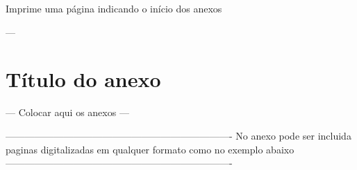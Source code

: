 
\begin{anexosenv}
	
	Imprime uma página indicando o início dos anexos
	\partanexos	
	
	---
	\chapter{Título do anexo}
	---
	Colocar aqui os anexos
	---
	
	----------------------------------------------------------------------
	 No anexo pode ser incluida paginas digitalizadas em qualquer formato
	 como no exemplo abaixo
	----------------------------------------------------------------------
	
	
	
\end{anexosenv}